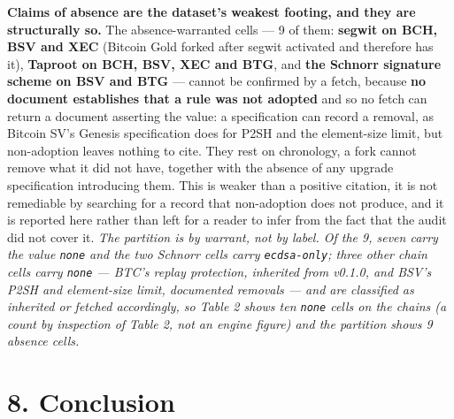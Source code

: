 \documentclass[
]{article}
\newcounter{none} %
\begin{document}
\textbf{Claims of absence are the dataset's weakest footing, and they
are structurally so.} The absence-warranted cells --- 9 of them:
\textbf{segwit on BCH, BSV and XEC} (Bitcoin Gold forked after segwit
activated and therefore has it), \textbf{Taproot on BCH, BSV, XEC and
BTG}, and \textbf{the Schnorr signature scheme on BSV and BTG} ---
cannot be confirmed by a fetch, because \textbf{no document establishes
that a rule was not adopted} and so no fetch can return a document
asserting the value: a specification can record a removal, as Bitcoin
SV's Genesis specification does for P2SH and the element-size limit, but
non-adoption leaves nothing to cite. They rest on chronology, a fork
cannot remove what it did not have, together with the absence of any
upgrade specification introducing them. This is weaker than a positive
citation, it is not remediable by searching for a record that
non-adoption does not produce, and it is reported here rather than left
for a reader to infer from the fact that the audit did not cover it.
\emph{The partition is by warrant, not by label. Of the 9, seven carry
the value \texttt{none} and the two Schnorr cells carry
\texttt{ecdsa-only}; three other chain cells carry \texttt{none} ---
BTC's replay protection, inherited from v0.1.0, and BSV's P2SH and
element-size limit, documented removals --- and are classified as
inherited or fetched accordingly, so Table 2 shows ten \texttt{none}
cells on the chains (a count by inspection of Table 2, not an engine
figure) and the partition shows 9 absence cells.}

\section{8. Conclusion}\label{conclusion}
\end{document}
